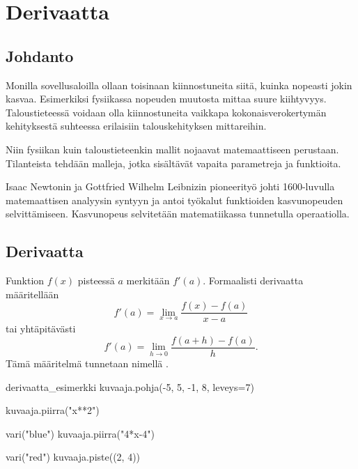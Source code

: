 \chapter{Derivaatta}

\section{Johdanto}


Monilla sovellusaloilla ollaan toisinaan kiinnostuneita siitä, kuinka nopeasti jokin kasvaa.
Esimerkiksi fysiikassa nopeuden muutosta mittaa suure kiihtyvyys. Taloustieteessä voidaan olla
kiinnostuneita vaikkapa kokonaisverokertymän kehityksestä suhteessa erilaisiin talouskehityksen mittareihin.

Niin fysiikan kuin taloustieteenkin mallit nojaavat matemaattiseen perustaan.
Tilanteista tehdään malleja, jotka sisältävät vapaita parametreja ja funktioita.

Isaac Newtonin ja Gottfried Wilhelm Leibnizin pioneerityö johti 1600-luvulla
matemaattisen analyysin syntyyn ja antoi työkalut funktioiden kasvunopeuden selvittämiseen.
Kasvunopeus selvitetään matematiikassa  tunnetulla operaatiolla.

\section{Derivaatta}

Funktion $f(x)$  pisteessä $a$ merkitään $f'(a)$.
Formaalisti derivaatta määritellään
\[ f'(a) = \lim\limits_{x \to a} \frac{f(x)-f(a)}{x-a} \]
tai yhtäpitävästi
\[ f'(a) = \lim\limits_{h \to 0} \frac{f(a+h)-f(a)}{h}. \]
Tämä määritelmä tunnetaan nimellä .

\begin{luoKuva}{derivaatta_esimerkki}
    kuvaaja.pohja(-5, 5, -1, 8, leveys=7)
    
    kuvaaja.piirra("x**2")
    
    vari("blue")
    kuvaaja.piirra("4*x-4")
   
    vari("red")
    kuvaaja.piste((2, 4))
\end{luoKuva}

